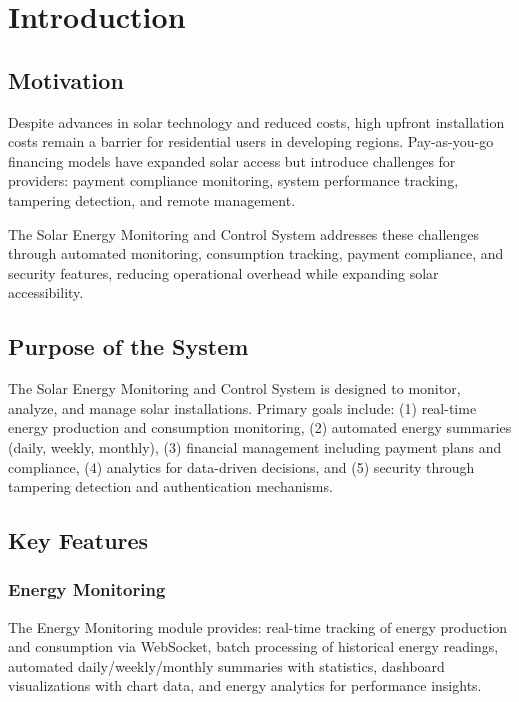 \chapter{Introduction}
\label{ch:intro}

\section{Motivation}
\label{sec:motivation}
Despite advances in solar technology and reduced costs, high upfront installation costs remain a barrier for residential users in developing regions. Pay-as-you-go financing models have expanded solar access but introduce challenges for providers: payment compliance monitoring, system performance tracking, tampering detection, and remote management.

The Solar Energy Monitoring and Control System addresses these challenges through automated monitoring, consumption tracking, payment compliance, and security features, reducing operational overhead while expanding solar accessibility.

\section{Purpose of the System}
\label{sec:purpose}
The Solar Energy Monitoring and Control System is designed to monitor, analyze, and manage solar installations. Primary goals include: (1) real-time energy production and consumption monitoring, (2) automated energy summaries (daily, weekly, monthly), (3) financial management including payment plans and compliance, (4) analytics for data-driven decisions, and (5) security through tampering detection and authentication mechanisms.

\section{Key Features}
\label{sec:keyfeatures}

\subsection{Energy Monitoring}
\label{subsec:energymonitoring}

The Energy Monitoring module provides: real-time tracking of energy production and consumption via WebSocket, batch processing of historical energy readings, automated daily/weekly/monthly summaries with statistics, dashboard visualizations with chart data, and energy analytics for performance insights.



